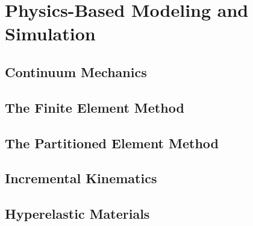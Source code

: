 \chapter{Physics-Based Modeling and Simulation}
\label{chap:4}
%
\section{Continuum Mechanics}
\label{Continuum Mechanics}
\section{The Finite Element Method}
\label{The Finite Element Method}

\section{The Partitioned Element Method}
\label{The Partitioned Element Method}

\section{Incremental Kinematics}
\label{Incremental Kinematics}

\section{Hyperelastic Materials}
\label{Hyperelastic Materials}

